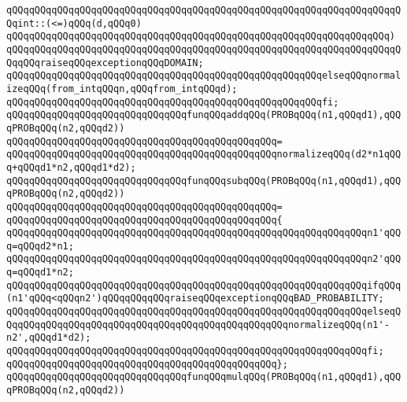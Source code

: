 \verb|qQQqqQQqqQQqqQQqqQQqqQQqqQQqqQQqqQQqqQQqqQQqqQQqqQQqqQQqqQQqqQQqqQQqqQQqint::(<=)qQQq(d,qQQq0)|\newline
\verb|qQQqqQQqqQQqqQQqqQQqqQQqqQQqqQQqqQQqqQQqqQQqqQQqqQQqqQQqqQQqqQQqqQQq)|\newline
\verb|qQQqqQQqqQQqqQQqqQQqqQQqqQQqqQQqqQQqqQQqqQQqqQQqqQQqqQQqqQQqqQQqqQQqqQQqqQQqraiseqQQqexceptionqQQqDOMAIN;|\newline
\verb|qQQqqQQqqQQqqQQqqQQqqQQqqQQqqQQqqQQqqQQqqQQqqQQqqQQqqQQqelseqQQqnormalizeqQQq(from_intqQQqn,qQQqfrom_intqQQqd);|\newline
\verb|qQQqqQQqqQQqqQQqqQQqqQQqqQQqqQQqqQQqqQQqqQQqqQQqqQQqqQQqfi;|\newline
\newline
\verb|qQQqqQQqqQQqqQQqqQQqqQQqqQQqqQQqfunqQQqaddqQQq(PROBqQQq(n1,qQQqd1),qQQqPROBqQQq(n2,qQQqd2))|\newline
\verb|qQQqqQQqqQQqqQQqqQQqqQQqqQQqqQQqqQQqqQQqqQQqqQQq=|\newline
\verb|qQQqqQQqqQQqqQQqqQQqqQQqqQQqqQQqqQQqqQQqqQQqqQQqnormalizeqQQq(d2*n1qQQq+qQQqd1*n2,qQQqd1*d2);|\newline
\newline
\verb|qQQqqQQqqQQqqQQqqQQqqQQqqQQqqQQqfunqQQqsubqQQq(PROBqQQq(n1,qQQqd1),qQQqPROBqQQq(n2,qQQqd2))|\newline
\verb|qQQqqQQqqQQqqQQqqQQqqQQqqQQqqQQqqQQqqQQqqQQqqQQq=|\newline
\verb|qQQqqQQqqQQqqQQqqQQqqQQqqQQqqQQqqQQqqQQqqQQqqQQq{|\newline
\verb|qQQqqQQqqQQqqQQqqQQqqQQqqQQqqQQqqQQqqQQqqQQqqQQqqQQqqQQqqQQqqQQqn1'qQQq=qQQqd2*n1;|\newline
\verb|qQQqqQQqqQQqqQQqqQQqqQQqqQQqqQQqqQQqqQQqqQQqqQQqqQQqqQQqqQQqqQQqn2'qQQq=qQQqd1*n2;|\newline
\newline
\verb|qQQqqQQqqQQqqQQqqQQqqQQqqQQqqQQqqQQqqQQqqQQqqQQqqQQqqQQqqQQqqQQqifqQQq(n1'qQQq<qQQqn2')qQQqqQQqqQQqraiseqQQqexceptionqQQqBAD_PROBABILITY;|\newline
\verb|qQQqqQQqqQQqqQQqqQQqqQQqqQQqqQQqqQQqqQQqqQQqqQQqqQQqqQQqqQQqqQQqelseqQQqqQQqqQQqqQQqqQQqqQQqqQQqqQQqqQQqqQQqqQQqqQQqqQQqnormalizeqQQq(n1'-n2',qQQqd1*d2);|\newline
\verb|qQQqqQQqqQQqqQQqqQQqqQQqqQQqqQQqqQQqqQQqqQQqqQQqqQQqqQQqqQQqqQQqfi;|\newline
\verb|qQQqqQQqqQQqqQQqqQQqqQQqqQQqqQQqqQQqqQQqqQQqqQQq};|\newline
\newline
\verb|qQQqqQQqqQQqqQQqqQQqqQQqqQQqqQQqfunqQQqmulqQQq(PROBqQQq(n1,qQQqd1),qQQqPROBqQQq(n2,qQQqd2))|\newline
